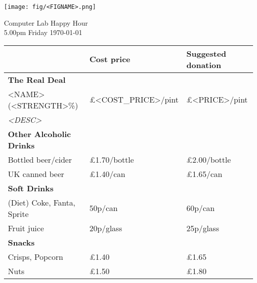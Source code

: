 \documentclass[a4paper,12pt]{article}
\begin{document}
\thispagestyle{empty}

\begin{center}
	\texttt{[image: fig/<FIGNAME>.png]} \par \bigskip \bigskip \bigskip
    {\Large Computer Lab Happy Hour} \\ \smallskip
    {5.00pm Friday \today}
\end{center}

\bigskip

\large
\begin{center}

\def\arraystretch{1.1}

\begin{tabular}{p{7.5cm}|p{3cm}|p{3cm}} & \textbf{Cost price} & \textbf{Suggested donation} \\
\hline
\textbf{The Real Deal} & & \\
<NAME> (<STRENGTH>\%) & \pounds <COST_PRICE>/pint & \pounds <PRICE>/pint \\
\small \it <DESC> \medskip & & \\

\hline
{\bf Other Alcoholic Drinks} & & \\
Bottled beer/cider & \pounds 1.70/bottle & \pounds 2.00/bottle \\
UK canned beer & \pounds 1.40/can & \pounds 1.65/can \medskip \\

\hline
{\bf Soft Drinks} &&\\
(Diet) Coke, Fanta, Sprite & 50p/can  & 60p/can \\
Fruit juice & 20p/glass & 25p/glass \medskip \\

\hline
{\bf Snacks} & & \\
Crisps, Popcorn &\pounds 1.40 &\pounds 1.65 \\
Nuts &\pounds 1.50 &\pounds 1.80 \\

\end{tabular}
\end{center}
\end{document}
